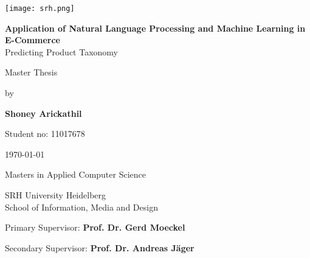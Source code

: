 \begin{titlepage}

    
        \begin{flushright}        
  
                \texttt{[image: srh.png]}
           
        \end{flushright}
    \vspace*{3\baselineskip}

    \centering
   

    {{\LARGE \bfseries Application of Natural Language Processing and Machine Learning in E-Commerce}\\[0.3cm]{\Large Predicting Product Taxonomy}}
    
    \vspace*{3\baselineskip}

    {\Large Master Thesis}
    \vspace*{1\baselineskip}

    {\Large by }
    \vspace*{2\baselineskip}

    {\Large  \bfseries Shoney Arickathil }
    \vspace*{0.5\baselineskip}

    {\Large  Student no: 11017678 }
    \vspace*{2\baselineskip}

    {\Large \today}
    \vspace*{8\baselineskip}


    {\Large  Masters in Applied Computer Science }
    \vspace*{0.5\baselineskip}

    {\Large  SRH University Heidelberg \\ School of Information, Media and Design }  
    \vspace*{6\baselineskip}

    \begin{minipage}{\textwidth}
        \begin{flushleft} %
            \large Primary Supervisor: \hfill \bfseries Prof. Dr. Gerd Moeckel 
        \end{flushleft}

        \begin{flushleft} %
            \large Secondary Supervisor: \hfill \bfseries Prof. Dr. Andreas Jäger
           
        \end{flushleft}
       
       
    \end{minipage}



    


   
    
\end{titlepage}